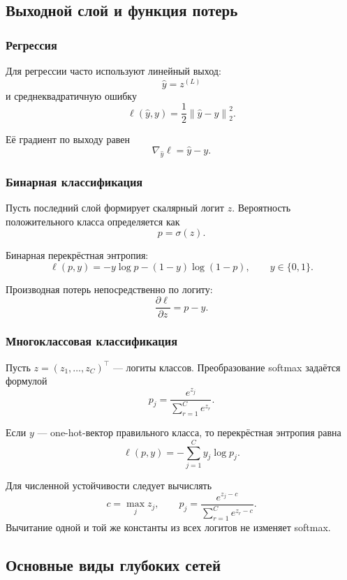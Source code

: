 \documentclass[12pt,a4paper]{article}
\theoremstyle{plain}
\theoremstyle{definition}
\theoremstyle{remark}
\newcommand{\norm}[1]{\left\lVert #1 \right\rVert}
\begin{document}
\subsection{Выходной слой и функция потерь}

\subsubsection{Регрессия}

Для регрессии часто используют линейный выход:
\[
    \widehat{y}=z^{(L)}
\]
и среднеквадратичную ошибку
\[
    \ell(\widehat{y},y)
    =
    \frac{1}{2}
    \norm{\widehat{y}-y}_2^2.
\]

Её градиент по выходу равен
\[
    \nabla_{\widehat{y}}\ell
    =
    \widehat{y}-y.
\]

\subsubsection{Бинарная классификация}

Пусть последний слой формирует скалярный логит $z$. Вероятность
положительного класса определяется как
\[
    p=\sigma(z).
\]

Бинарная перекрёстная энтропия:
\[
    \ell(p,y)
    =
    -y\log p-(1-y)\log(1-p),
    \qquad y\in\{0,1\}.
\]

Производная потерь непосредственно по логиту:
\[
    \frac{\partial\ell}{\partial z}
    =
    p-y.
\]

\subsubsection{Многоклассовая классификация}

Пусть $z=(z_1,\ldots,z_C)^\top$ --- логиты классов. Преобразование
softmax задаётся формулой
\[
    p_j
    =
    \frac{e^{z_j}}
    {\sum_{r=1}^{C}e^{z_r}}.
\]

Если $y$ --- one-hot-вектор правильного класса, то перекрёстная
энтропия равна
\[
    \ell(p,y)
    =
    -\sum_{j=1}^{C}y_j\log p_j.
\]

Для численной устойчивости следует вычислять
\[
    c=\max_j z_j,
    \qquad
    p_j
    =
    \frac{e^{z_j-c}}
    {\sum_{r=1}^{C}e^{z_r-c}}.
\]
Вычитание одной и той же константы из всех логитов не изменяет
softmax.

\subsection{Основные виды глубоких сетей}
\end{document}
